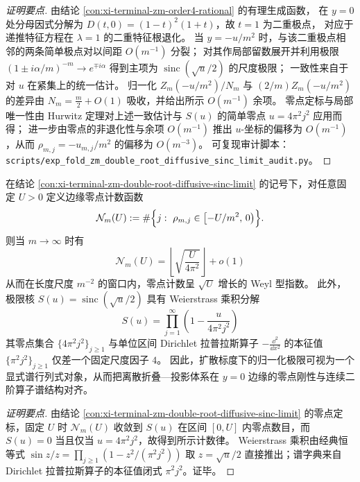 \begin{proof}[证明要点]
由结论 \ref{con:xi-terminal-zm-order4-rational} 的有理生成函数，
在 \(y=0\) 处分母因式分解为 \(D(t,0)=(1-t)^2(1+t)\)，故 \(t=1\) 为二重极点，
对应于递推特征方程在 \(\lambda=1\) 的二重特征根退化。
当 \(y=-u/m^2\) 时，与该二重极点相邻的两条简单极点对以间距 \(O(m^{-1})\) 分裂；
对其作局部留数展开并利用极限
\(
(1\pm i\alpha/m)^{-m}\to e^{\mp i\alpha}
\)
得到主项为 \(\operatorname{sinc}(\sqrt{u}/2)\) 的尺度极限；
一致性来自于对 \(u\) 在紧集上的统一估计。
归一化 \(Z_m(-u/m^2)/N_m\) 与 \((2/m)Z_m(-u/m^2)\) 的差异由 \(N_m=\frac m2+O(1)\) 吸收，并给出所示 \(O(m^{-1})\) 余项。
零点定标与局部唯一性由 Hurwitz 定理对上述一致估计与 \(S(u)\) 的简单零点 \(u=4\pi^{2}j^{2}\) 应用而得；
进一步由零点的非退化性与余项 \(O(m^{-1})\) 推出 \(u\)-坐标的偏移为 \(O(m^{-1})\)，从而 \(\rho_{m,j}=-u_{m,j}/m^2\) 的偏移为 \(O(m^{-3})\)。
可复现审计脚本：\texttt{scripts/exp\_fold\_zm\_double\_root\_diffusive\_sinc\_limit\_audit.py}。
\end{proof}

\begin{conclusion}\label{con:xi-terminal-zm-diffusive-edge-weyl-spectral-determinant}
在结论 \ref{con:xi-terminal-zm-double-root-diffusive-sinc-limit} 的记号下，对任意固定 \(U>0\) 定义边缘零点计数函数
\[
\mathcal N_m(U):=\#\Bigl\{j:\ \rho_{m,j}\in\bigl[-U/m^2,\,0\bigr)\Bigr\}.
\]
则当 \(m\to\infty\) 时有
\[
\boxed{\;
\mathcal N_m(U)=\left\lfloor \sqrt{\frac{U}{4\pi^2}}\right\rfloor+o(1)\;}
\]
从而在长度尺度 \(m^{-2}\) 的窗口内，零点计数呈 \(\sqrt{U}\) 增长的 Weyl 型指数。
此外，极限核 \(S(u)=\operatorname{sinc}(\sqrt{u}/2)\) 具有 Weierstrass 乘积分解
\[
\boxed{\;
S(u)=\prod_{j=1}^{\infty}\left(1-\frac{u}{4\pi^2 j^2}\right)\;}
\]
其零点集合 \(\{4\pi^2 j^2\}_{j\ge 1}\) 与单位区间 Dirichlet 拉普拉斯算子 \(-\frac{\dd^2}{\dd x^2}\) 的本征值 \(\{\pi^2 j^2\}_{j\ge 1}\) 仅差一个固定尺度因子 \(4\)。
因此，扩散标度下的归一化极限可视为一个显式谱行列式对象，从而把离散折叠—投影体系在 \(y=0\) 边缘的零点刚性与连续二阶算子谱结构对齐。
\end{conclusion}
\begin{proof}[证明要点]
由结论 \ref{con:xi-terminal-zm-double-root-diffusive-sinc-limit} 的零点定标，固定 \(U\) 时 \(\mathcal N_m(U)\) 收敛到 \(S(u)\) 在区间 \([0,U]\) 内零点数目，而 \(S(u)=0\) 当且仅当 \(u=4\pi^2 j^2\)，故得到所示计数律。
Weierstrass 乘积由经典恒等式 \(\sin z/z=\prod_{j\ge 1}(1-z^2/(\pi^2 j^2))\) 取 \(z=\sqrt{u}/2\) 直接推出；谱字典来自 Dirichlet 拉普拉斯算子的本征值闭式 \(\pi^2 j^2\)。证毕。
\end{proof}

